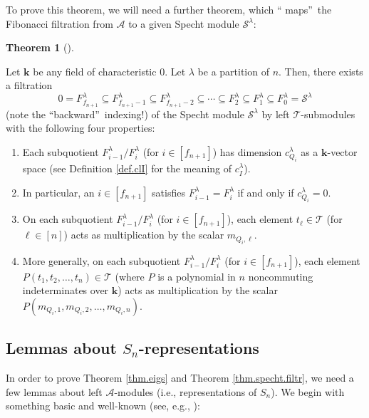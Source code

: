 \documentclass[numbers=enddot,12pt,final,onecolumn,notitlepage]{scrartcl}%
\theoremstyle{definition}
\newtheorem{theo}{Theorem}[section]
\newenvironment{theorem}[1][]
{\begin{theo}[#1]\begin{leftbar}}
{\end{leftbar}\end{theo}}
\begin{document}
To prove this theorem, we will need a further theorem, which \textquotedblleft
maps\textquotedblright\ the Fibonacci filtration from $\mathcal{A}$ to a given
Specht module $\mathcal{S}^{\lambda}$:

\begin{theorem}
\label{thm.specht.filtr}Let $\mathbf{k}$ be any field of characteristic $0$.
Let $\lambda$ be a partition of $n$. Then, there exists a filtration
\[
0=F_{f_{n+1}}^{\lambda}\subseteq F_{f_{n+1}-1}^{\lambda}\subseteq
F_{f_{n+1}-2}^{\lambda}\subseteq\cdots\subseteq F_{2}^{\lambda}\subseteq
F_{1}^{\lambda}\subseteq F_{0}^{\lambda}=\mathcal{S}^{\lambda}%
\]
(note the \textquotedblleft backward\textquotedblright\ indexing!) of the
Specht module $\mathcal{S}^{\lambda}$ by left $\mathcal{T}$-submodules with
the following four properties:

\begin{enumerate}
\item Each subquotient $F_{i-1}^{\lambda}/F_{i}^{\lambda}$ (for $i\in\left[
f_{n+1}\right]  $) has dimension $c_{Q_{i}}^{\lambda}$ as a $\mathbf{k}%
$-vector space (see Definition \ref{def.clI} for the meaning of $c_{I}%
^{\lambda}$).

\item In particular, an $i\in\left[  f_{n+1}\right]  $ satisfies
$F_{i-1}^{\lambda}=F_{i}^{\lambda}$ if and only if $c_{Q_{i}}^{\lambda}=0$.

\item On each subquotient $F_{i-1}^{\lambda}/F_{i}^{\lambda}$ (for
$i\in\left[  f_{n+1}\right]  $), each element $t_{\ell}\in\mathcal{T}$ (for
$\ell\in\left[  n\right]  $) acts as multiplication by the scalar
$m_{Q_{i},\ell}$.

\item More generally, on each subquotient $F_{i-1}^{\lambda}/F_{i}^{\lambda}$
(for $i\in\left[  f_{n+1}\right]  $), each element $P\left(  t_{1}%
,t_{2},\ldots,t_{n}\right)  \in\mathcal{T}$ (where $P$ is a polynomial in $n$
noncommuting indeterminates over $\mathbf{k}$) acts as multiplication by the
scalar $P\left(  m_{Q_{i},1},m_{Q_{i},2},\ldots,m_{Q_{i},n}\right)  $.
\end{enumerate}
\end{theorem}

\subsection{Lemmas about $S_{n}$-representations}

In order to prove Theorem \ref{thm.eigs} and Theorem \ref{thm.specht.filtr},
we need a few lemmas about left $\mathcal{A}$-modules (i.e., representations
of $S_{n}$). We begin with something basic and well-known (see, e.g.,
\cite[last paragraph of \S 5.13]{Etingof-et-al}):
\end{document}
